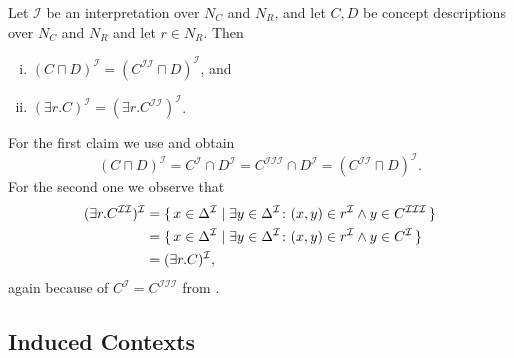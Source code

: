 \begin{Proposition}
  \label{prop:double-II-under-I}
  Let $\mathcal{I}$ be an interpretation over $N_C$ and $N_R$, and let $C, D$ be \ELgfpbot
  concept descriptions over $N_C$ and $N_R$ and let $r \in N_R$.  Then
  \begin{enumerate}[i. ]
  \item $(C \sqcap D)^{\mathcal{I}} = (C^{\mathcal{I}\mathcal{I}} \sqcap
    D)^{\mathcal{I}}$, and
  \item $(\exists r. C)^{\mathcal{I}} = (\exists r. C^{\mathcal{I}\mathcal{I}})^{\mathcal{I}}$.
  \end{enumerate}
\end{Proposition}
\begin{Proof}
  For the first claim we use  and obtain
  \begin{equation*}
    (C \sqcap D)^{\mathcal{I}} = C^{\mathcal{I}} \cap D^{\mathcal{I}} =
    C^{\mathcal{I}\mathcal{I}\mathcal{I}} \cap D^{\mathcal{I}} =
    (C^{\mathcal{I}\mathcal{I}} \sqcap D)^{\mathcal{I}}.
  \end{equation*}
  For the second one we observe that
  \begin{align*}
    (\exists r. C^{\mathcal{I}\mathcal{I}})^{\mathcal{I}}
    &= {\{\, x \in \Delta^{\mathcal{I}} \mid \exists y \in \Delta^{\mathcal{I}} \colon (x, y)
      \in r^{\mathcal{I}} \wedge y \in C^{\mathcal{I}\mathcal{I}\mathcal{I}} \,\}}\\
    &= {\{\, x \in \Delta^{\mathcal{I}} \mid \exists y \in \Delta^{\mathcal{I}} \colon (x, y)
      \in r^{\mathcal{I}} \wedge y \in C^{\mathcal{I}} \,\}} \\
    &= (\exists r. C)^{\mathcal{I}},
  \end{align*}
  again because of $C^{\mathcal{I}} = C^{\mathcal{I}\mathcal{I}\mathcal{I}}$ from
  .
\end{Proof}


\subsection{Induced Contexts}
\label{sec:induced-contexts}

%
%
%

